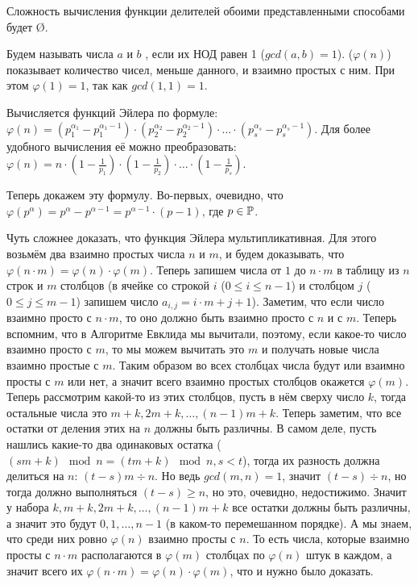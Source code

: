 Сложность вычисления функции делителей обоими представленными способами будет \O{}.


\hypertarget{euler_function}{}
Будем называть числа $a$ и $b$ , если их НОД равен 1 ($gcd(a, b) = 1$).  ($\varphi(n)$) показывает количество чисел, меньше данного, и взаимно простых с ним. При этом $\varphi(1) = 1$, так как $gcd(1, 1) = 1$.

Вычисляется функций Эйлера по формуле: $\varphi(n) = (p_1^{\alpha_1} - p_1^{\alpha_1 - 1}) \cdot (p_2^{\alpha_2} - p_2^{\alpha_2 - 1}) \cdot \ldots \cdot (p_s^{\alpha_s} - p_s^{\alpha_s - 1})$. Для более удобного вычисления её можно преобразовать: $\varphi(n) = n \cdot (1 - \frac{1}{p_1}) \cdot (1 - \frac{1}{p_2}) \cdot \ldots \cdot (1 - \frac{1}{p_s})$.

Теперь докажем эту формулу. Во-первых, очевидно, что $\varphi(p^\alpha) = p^{\alpha} - p^{\alpha - 1} = p^{\alpha - 1} \cdot (p - 1)$, где $p \in \mathbb{P}$.

Чуть сложнее доказать, что функция Эйлера мультипликативная. Для этого возьмём два взаимно простых числа $n$ и $m$, и будем доказывать, что $\varphi(n \cdot m) = \varphi(n) \cdot \varphi(m)$. Теперь запишем числа от $1$ до $n \cdot m$ в таблицу из $n$ строк и $m$ столбцов (в ячейке со строкой $i$ ($0 \leq i \leq n - 1$) и столбцом $j$ ($0 \leq j \leq m - 1$) запишем число $a_{i, j} = i \cdot m + j + 1$). Заметим, что если число взаимно просто с $n \cdot m$, то оно должно быть взаимно просто с $n$ и с $m$. Теперь вспомним, что в Алгоритме Евклида мы вычитали, поэтому, если какое-то число взаимно просто с $m$, то мы можем вычитать это $m$ и получать новые числа взаимно простые с $m$. Таким образом во всех столбцах числа будут или взаимно просты с $m$ или нет, а значит всего взаимно простых столбцов окажется $\varphi(m)$. Теперь рассмотрим какой-то из этих столбцов, пусть в нём сверху число $k$, тогда остальные числа это $m + k, 2m + k, \ldots, (n - 1)m + k$. Теперь заметим, что все остатки от деления этих на $n$ должны быть различны. В самом деле, пусть нашлись какие-то два одинаковых остатка ($(sm + k) \mod n = (tm + k) \mod n, s < t$), тогда их разность должна делиться на $n$: $(t - s)m \div n$. Но ведь $gcd(m, n) = 1$, значит $(t - s) \div n$, но тогда должно выполняться $(t - s) \geq n$, но это, очевидно, недостижимо. Значит у набора $k, m + k, 2m + k, \ldots, (n - 1)m + k$ все остатки должны быть различны, а значит это будут $0, 1, \ldots, n - 1$ (в каком-то перемешанном порядке). А мы знаем, что среди них ровно $\varphi(n)$ взаимно просты с $n$. То есть числа, которые взаимно просты с $n \cdot m$ располагаются в $\varphi(m)$ столбцах по $\varphi(n)$ штук в каждом, а значит всего их $\varphi(n \cdot m) = \varphi(n) \cdot \varphi(m)$, что и нужно было доказать.

